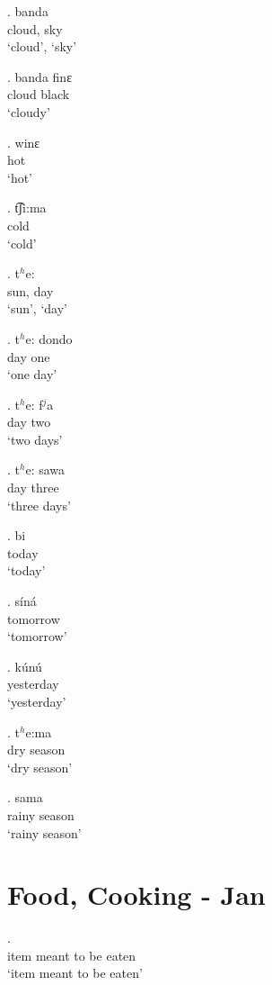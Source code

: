 \documentclass{assets/fieldnotes}
\begin{document}
    \exg. banda\\
    cloud, sky\\
        `cloud', `sky'

    \exg. banda finɛ\\
        cloud black\\
        `cloudy'

    \exg. winɛ\\
    hot\\
        `hot'
        
    \exg. t͡ʃi:ma\\
    cold\\
        `cold'

    \exg. t$^h$e:\\
    sun, day\\
        `sun', `day'
        
    \exg. t$^h$e: dondo\\
        day one\\
        `one day'

    \exg. t$^h$e: f$^j$a\\
        day two\\
        `two days'

    \exg. t$^h$e: sawa\\
        day three\\
        `three days'

    \exg. bi\\
    today\\
        `today'

    \exg. síná\\
    tomorrow\\
        `tomorrow'

    \exg. kúnú\\
    yesterday\\
        `yesterday'


    \exg. t$^h$e:ma\\
    dry season\\
        `dry season'

    \exg. sama\\
    rainy season\\
        `rainy season'

               
\section{Food, Cooking - Jan} 
\exg.  \\
item meant to be eaten \\ 
`item meant to be eaten'
\end{document}
